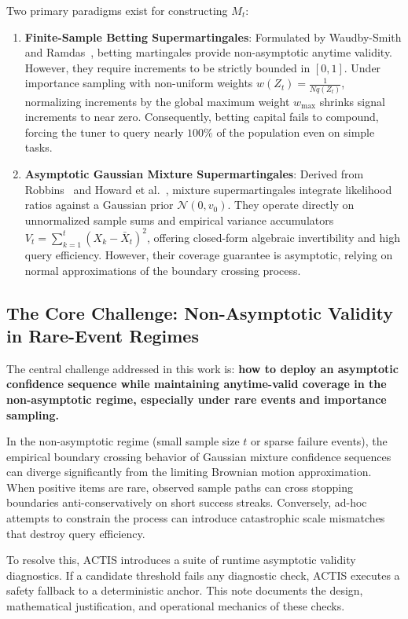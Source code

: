 \documentclass[11pt,a4paper]{article}
\begin{document}
Two primary paradigms exist for constructing $M_t$:
\begin{enumerate}[leftmargin=*]
    \item \textbf{Finite-Sample Betting Supermartingales}: Formulated by Waudby-Smith and Ramdas~\cite{waudby2024}, betting martingales provide non-asymptotic anytime validity. However, they require increments to be strictly bounded in $[0, 1]$. Under importance sampling with non-uniform weights $w(Z_t) = \frac{1}{N q(Z_t)}$, normalizing increments by the global maximum weight $w_{\max}$ shrinks signal increments to near zero. Consequently, betting capital fails to compound, forcing the tuner to query nearly $100\%$ of the population even on simple tasks.
    \item \textbf{Asymptotic Gaussian Mixture Supermartingales}: Derived from Robbins~\cite{robbins1970} and Howard et al.~\cite{howard2021}, mixture supermartingales integrate likelihood ratios against a Gaussian prior $\mathcal{N}(0, v_0)$. They operate directly on unnormalized sample sums and empirical variance accumulators $V_t = \sum_{k=1}^t (X_k - \bar{X}_t)^2$, offering closed-form algebraic invertibility and high query efficiency. However, their coverage guarantee is asymptotic, relying on normal approximations of the boundary crossing process.
\end{enumerate}

\subsection{The Core Challenge: Non-Asymptotic Validity in Rare-Event Regimes}
The central challenge addressed in this work is: \textbf{how to deploy an asymptotic confidence sequence while maintaining anytime-valid coverage in the non-asymptotic regime, especially under rare events and importance sampling.}

In the non-asymptotic regime (small sample size $t$ or sparse failure events), the empirical boundary crossing behavior of Gaussian mixture confidence sequences can diverge significantly from the limiting Brownian motion approximation. When positive items are rare, observed sample paths can cross stopping boundaries anti-conservatively on short success streaks. Conversely, ad-hoc attempts to constrain the process can introduce catastrophic scale mismatches that destroy query efficiency. 

To resolve this, ACTIS introduces a suite of runtime asymptotic validity diagnostics. If a candidate threshold fails any diagnostic check, ACTIS executes a safety fallback to a deterministic anchor. This note documents the design, mathematical justification, and operational mechanics of these checks.
\end{document}
